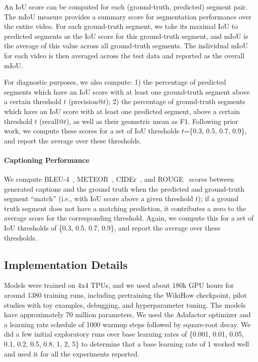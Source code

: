 \documentclass[11pt]{article}
\begin{document}
An IoU score can be computed for each (ground-truth, predicted) segment pair.
The mIoU measure provides a summary score for segmentation performance over the entire video. For each ground-truth segment, we take its maximal IoU to predicted segments as the IoU score for this ground-truth segment, and mIoU is the average of this value across all ground-truth segments.
The individual mIoU for each video is then averaged across the test data and reported as the overall mIoU.

For diagnostic purposes, we also compute: 1) the percentage of predicted segments which have an IoU score with at least one ground-truth segment above a certain threshold  $t$ (precision@$t$); 2) the percentage of ground-truth segments which have an IoU score with at least one predicted segment, above a certain threshold $t$ (recall@$t$), as well as their geometric mean as F1. Following prior work, we compute these scores for a set of IoU thresholds $t$=\{0.3, 0.5, 0.7, 0.9\}, and report the average over these thresholds.



\paragraph{Captioning Performance}
We compute BLEU-4~\citep{Papineni2002BleuAM}, METEOR~\citep{Banerjee2005METEORAA}, CIDEr~\citep{Vedantam2015CIDErCI}, and ROUGE~\citep{Lin2004ROUGEAP} scores between generated captions and the ground truth when the predicted and ground-truth segment ``match'' (i.e., with IoU score above a given threshold $t$); if a ground truth segment does not have a matching prediction, it contributes a zero to the average score for the corresponding threshold. Again, we compute this for a set of IoU thresholds of \{0.3, 0.5, 0.7, 0.9\}, and report the average over these thresholds.


\subsection{Implementation Details}
Models were trained on 4x4 TPUs, and we used about 180k GPU hours for around 1380 training runs, including pretraining the WikiHow checkpoint, pilot studies with toy examples, debugging, and hyperparameter tuning. The models have approximately 70 million parameters. 
We used the Adafactor \cite{shazeer:18} optimizer and a learning rate schedule of 1000 warmup steps followed by square-root decay. We did a few initial exploratory runs over base learning rates of \{0.001, 0.01, 0.05, 0.1, 0.2, 0.5, 0.8, 1, 2, 5\} to determine that a base learning rate of 1 worked well and used it for all the experiments reported.
\end{document}
